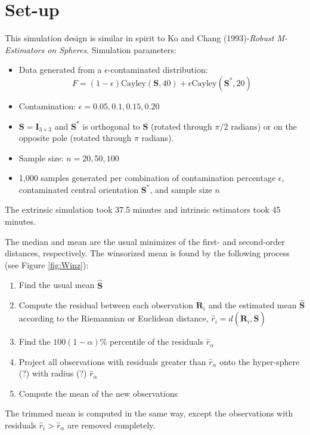 \documentclass{article}\usepackage[]{graphicx}\usepackage[]{color}
\begin{document}
\section{Set-up}

This simulation design is similar in spirit to Ko and Chang (1993)-\textit{Robust M-Estimators on Spheres}.  Simulation parameters:
\begin{itemize}
\item Data generated from a $\epsilon$-contaminated distribution:
\[
F=(1-\epsilon)\text{Cayley}(\bm S,40)+\epsilon\text{Cayley}(\bm S^*,20)
\]
\item Contamination: $\epsilon=0.05, 0.1, 0.15, 0.20$
\item $\bm S=\bm I_{3\times 3}$ and $\bm S^*$ is orthogonal to $\bm S$ (rotated through $\pi/2$ radians) or on the opposite pole (rotated through $\pi$ radians).
\item Sample size: $n=20,50,100$
\item 1,000 samples generated per combination of contamination percentage $\epsilon$, contaminated central orientation $\bm S^*$, and sample size $n$
\end{itemize}
The extrinsic simulation took 37.5 minutes and intrinsic estimators took 45 minutes.

The median and mean are the usual minimizes of the first- and second-order distances, respectively.  The winsorized mean is found by the following process (see Figure \ref{fig:Winz}):
\begin{enumerate}
\item Find the usual mean $\widehat{\bm S}$
\item Compute the residual between each observation $\bm R_i$ and the estimated mean $\widehat{\bm S}$ according to the Riemannian or Euclidean distance, $\hat r_i=d(\bm R_i,\widehat{\bm S})$
\item Find the $100(1-\alpha)\%$ percentile of the residuals $\hat r_\alpha$
\item Project all observations with residuals greater than $\hat r_\alpha$ onto the hyper-sphere (?) with radius (?) $\hat r_\alpha$
\item Compute the mean of the new observations
\end{enumerate}



The trimmed mean is computed in the same way, except the observations with residuals $\hat r_i>\hat r_\alpha$ are removed completely.
\end{document}
